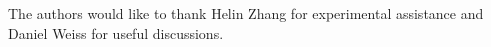 \begin{acknowledgments}
  The authors would like to thank Helin Zhang for experimental assistance
  and Daniel Weiss for useful discussions.
\end{acknowledgments}